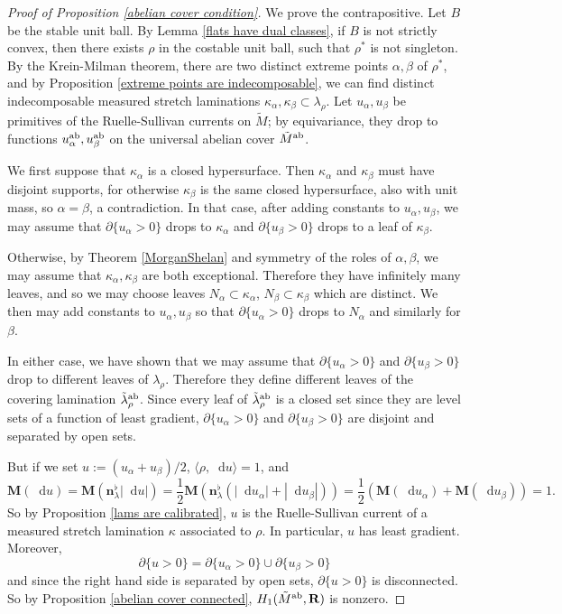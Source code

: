 \documentclass[reqno,11pt]{amsart}
\newcommand{\RR}{\mathbf{R}}
\newcommand*\dif{\mathop{}\!\mathrm{d}}
\newcommand{\normal}{\mathbf n}
\newcommand{\Mass}{\mathbf M}
\theoremstyle{definition}
\numberwithin{equation}{section}
\begin{document}
\begin{proof}[Proof of Proposition \ref{abelian cover condition}]
We prove the contrapositive.
Let $B$ be the stable unit ball.
By Lemma \ref{flats have dual classes}, if $B$ is not strictly convex, then there exists $\rho$ in the costable unit ball, such that $\rho^*$ is not singleton.
By the Krein-Milman theorem, there are two distinct extreme points $\alpha, \beta$ of $\rho^*$, and by Proposition \ref{extreme points are indecomposable}, we can find distinct indecomposable measured stretch laminations $\kappa_\alpha, \kappa_\beta \subset \lambda_\rho$.
Let $u_\alpha, u_\beta$ be primitives of the Ruelle-Sullivan currents on $\tilde M$; by equivariance, they drop to functions $u^{\rm ab}_\alpha, u^{\rm ab}_\beta$ on the universal abelian cover $\tilde M^{\rm ab}$.

We first suppose that $\kappa_\alpha$ is a closed hypersurface.
Then $\kappa_\alpha$ and $\kappa_\beta$ must have disjoint supports, for otherwise $\kappa_\beta$ is the same closed hypersurface, also with unit mass, so $\alpha = \beta$, a contradiction.
In that case, after adding constants to $u_\alpha, u_\beta$, we may assume that $\partial \{u_\alpha > 0\}$ drops to $\kappa_\alpha$ and $\partial \{u_\beta > 0\}$ drops to a leaf of $\kappa_\beta$.

Otherwise, by Theorem \ref{MorganShelan} and symmetry of the roles of $\alpha, \beta$, we may assume that $\kappa_\alpha, \kappa_\beta$ are both exceptional.
Therefore they have infinitely many leaves, and so we may choose leaves $N_\alpha \subset \kappa_\alpha$, $N_\beta \subset \kappa_\beta$ which are distinct.
We then may add constants to $u_\alpha, u_\beta$ so that $\partial \{u_\alpha > 0\}$ drops to $N_\alpha$ and similarly for $\beta$.

In either case, we have shown that we may assume that $\partial \{u_\alpha > 0\}$ and $\partial \{u_\beta > 0\}$ drop to different leaves of $\lambda_\rho$.
Therefore they define different leaves of the covering lamination $\tilde \lambda^{\rm ab}_\rho$.
Since every leaf of $\tilde \lambda^{\rm ab}_\rho$ is a closed set since they are level sets of a function of least gradient, $\partial \{u_\alpha > 0\}$ and $\partial \{u_\beta > 0\}$ are disjoint and separated by open sets.

But if we set $u := (u_\alpha + u_\beta)/2$, $\langle \rho, \dif u\rangle = 1$, and 
$$\Mass(\dif u) = \Mass(\normal^\flat_\lambda |\dif u|) = \frac{1}{2} \Mass(\normal^\flat_\lambda (|\dif u_\alpha| + |\dif u_\beta|)) = \frac{1}{2} (\Mass(\dif u_\alpha) + \Mass(\dif u_\beta)) = 1.$$
So by Proposition \ref{lams are calibrated}, $u$ is the Ruelle-Sullivan current of a measured stretch lamination $\kappa$ associated to $\rho$.
In particular, $u$ has least gradient.
Moreover,
$$\partial \{u > 0\} = \partial \{u_\alpha > 0\} \cup \partial \{u_\beta > 0\}$$
and since the right hand side is separated by open sets, $\partial \{u > 0\}$ is disconnected. 
So by Proposition \ref{abelian cover connected}, $H_1(\tilde M^{\rm ab}, \RR)$ is nonzero.
\end{proof}
\end{document}
